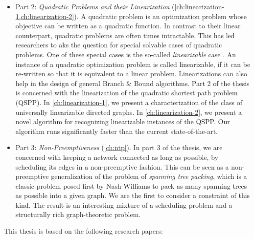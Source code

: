 \begin{itemize}
\item Part 2: \emph{Quadratic Problems and their Linearization}  (\cref{ch:linearization-1,ch:linearization-2}). 
A quadratic problem is an optimization problem whose objective can be written as a quadratic function. 
In contrast to their linear counterpart, quadratic problems are often times intractable. 
This has led researchers to aks the question for special solvable cases of quadratic problems. One of these special cases is the so-called \emph{linearizable} case \cite{bookhold1990contribution}. 
An instance of a quadratic optimization problem is called linearizable, if it can be re-written so that it is equivalent to a linear problem. Linearizations can also help in the design of general Branch \& Bound algorithms. Part 2 of the thesis is concerned with the linearization of the quadratic shortest path problem (QSPP). In \cref{ch:linearization-1}, we present a characterization of the class of universally linearizable directed graphs. In \cref{ch:linearization-2}, we present a novel algorithm for recognizing linearizable instances of the QSPP. Our algorithm runs significantly faster than the current state-of-the-art.

\item Part 3: \emph{Non-Preemptiveness} (\cref{ch:ntp}). In part 3 of the thesis, we are concerned with keeping a network connected as long as possible, by scheduling its edges in a non-preemptive fashion.
This can be seen as a non-preemptive generalization of the problem of \emph{spanning tree packing}, which is a classic problem posed first by Nash-Williams \cite{Nash-Williams1961} to pack as many spanning trees as possible into a given graph. We are the first to consider a constraint of this kind. The result is an interesting mixture of a scheduling problem and a structurally rich graph-theoretic problem.
\end{itemize}

This thesis is based on the following research papers:

